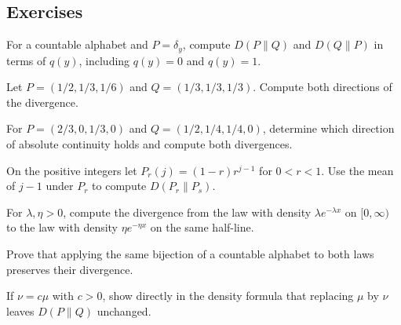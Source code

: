 \documentclass[11pt,oneside]{book}
\theoremstyle{definition}
\theoremstyle{remark}
\begin{document}
\subsection{Exercises}
\label{subsec:practice-3-2}

\begin{practiceexercise}
\label{pex:relative-entropy-point-mass}
For a countable alphabet and $P=\delta_y$, compute $D(P\|Q)$ and
$D(Q\|P)$ in terms of $q(y)$, including $q(y)=0$ and $q(y)=1$.
\end{practiceexercise}

\begin{practiceexercise}
\label{pex:relative-entropy-three-outcomes}
Let $P=(1/2,1/3,1/6)$ and $Q=(1/3,1/3,1/3)$. Compute both
directions of the divergence.
\end{practiceexercise}

\begin{practiceexercise}
\label{pex:relative-entropy-zero-coordinates}
For $P=(2/3,0,1/3,0)$ and $Q=(1/2,1/4,1/4,0)$, determine which
direction of absolute continuity holds and compute both divergences.
\end{practiceexercise}

\begin{practiceexercise}
\label{pex:relative-entropy-geometric}
On the positive integers let $P_r(j)=(1-r)r^{j-1}$ for $0<r<1$.
Use the mean of $j-1$ under $P_r$ to compute $D(P_r\|P_s)$.
\end{practiceexercise}

\begin{practiceexercise}
\label{pex:relative-entropy-exponential}
For $\lambda,\eta>0$, compute the divergence from the law with
density $\lambda e^{-\lambda x}$ on $[0,\infty)$ to the law with
density $\eta e^{-\eta x}$ on the same half-line.
\end{practiceexercise}

\begin{practiceexercise}[Relabeling]
\label{pex:relative-entropy-relabeling}
Prove that applying the same bijection of a countable alphabet
to both laws preserves their divergence.
\end{practiceexercise}

\begin{practiceexercise}
\label{pex:relative-entropy-reference-scale}
If $\nu=c\mu$ with $c>0$, show directly in the density formula
that replacing $\mu$ by $\nu$ leaves $D(P\|Q)$ unchanged.
\end{practiceexercise}
\end{document}
